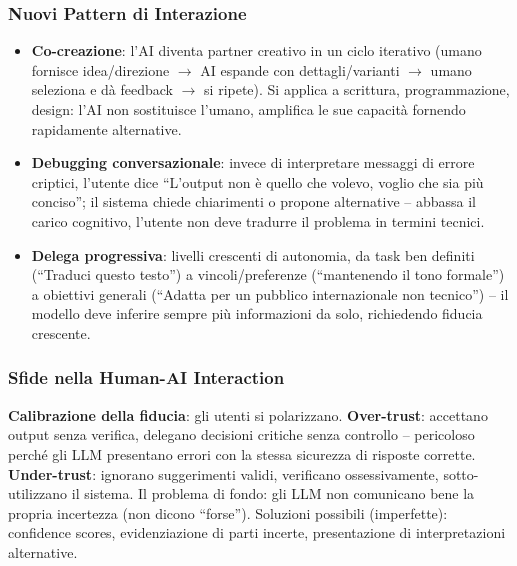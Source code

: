 \documentclass[12pt,a4paper]{article}
\begin{document}
\subsubsection{Nuovi Pattern di Interazione}

\begin{itemize}
  \item \textbf{Co-creazione}: l'AI diventa partner creativo in un ciclo iterativo (umano fornisce idea/direzione $\to$ AI espande con dettagli/varianti $\to$ umano seleziona e dà feedback $\to$ si ripete). Si applica a scrittura, programmazione, design: l'AI non sostituisce l'umano, amplifica le sue capacit\`a fornendo rapidamente alternative.
  \item \textbf{Debugging conversazionale}: invece di interpretare messaggi di errore criptici, l'utente dice ``L'output non \`e quello che volevo, voglio che sia pi\`u conciso''; il sistema chiede chiarimenti o propone alternative -- abbassa il carico cognitivo, l'utente non deve tradurre il problema in termini tecnici.
  \item \textbf{Delega progressiva}: livelli crescenti di autonomia, da task ben definiti (``Traduci questo testo'') a vincoli/preferenze (``mantenendo il tono formale'') a obiettivi generali (``Adatta per un pubblico internazionale non tecnico'') -- il modello deve inferire sempre pi\`u informazioni da solo, richiedendo fiducia crescente.
\end{itemize}

\subsubsection{Sfide nella Human-AI Interaction}

\begin{quizbox}
\textbf{Calibrazione della fiducia}: gli utenti si polarizzano. \textbf{Over-trust}: accettano output senza verifica, delegano decisioni critiche senza controllo -- pericoloso perch\'e gli LLM presentano errori con la stessa sicurezza di risposte corrette. \textbf{Under-trust}: ignorano suggerimenti validi, verificano ossessivamente, sotto-utilizzano il sistema. Il problema di fondo: gli LLM non comunicano bene la propria incertezza (non dicono ``forse''). Soluzioni possibili (imperfette): confidence scores, evidenziazione di parti incerte, presentazione di interpretazioni alternative.
\end{quizbox}
\end{document}
